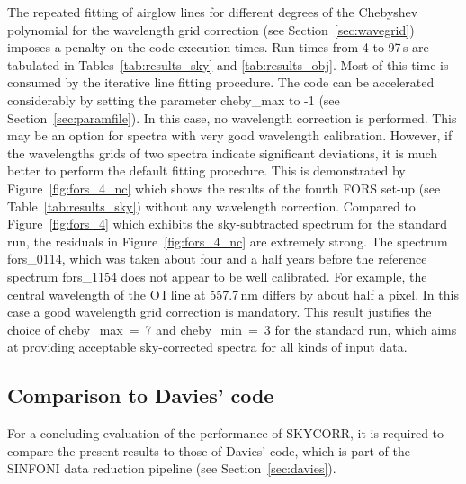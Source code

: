 The repeated fitting of airglow lines for different degrees of the Chebyshev
polynomial for the wavelength grid correction (see Section~\ref{sec:wavegrid})
imposes a penalty on the code execution times. Run times from 4 to 97\,s are
tabulated in Tables~\ref{tab:results_sky} and \ref{tab:results_obj}. Most of
this time is consumed by the iterative line fitting procedure. The code can be
accelerated considerably by setting the parameter {\sc cheby\_max} to -1 (see
Section~\ref{sec:paramfile}). In this case, no wavelength correction is
performed. This may be an option for spectra with very good wavelength
calibration. However, if the wavelengths grids of two spectra indicate
significant deviations, it is much better to perform the default fitting
procedure. This is demonstrated by Figure~\ref{fig:fors_4_nc} which shows the
results of the fourth FORS set-up (see Table~\ref{tab:results_sky}) without any
wavelength correction. Compared to Figure~\ref{fig:fors_4} which exhibits the
sky-subtracted spectrum for the standard run, the residuals in
Figure~\ref{fig:fors_4_nc} are extremely strong. The spectrum fors\_0114, which
was taken about four and a half years before the reference spectrum fors\_1154
does not appear to be well calibrated. For example, the central wavelength of
the O\,I line at 557.7\,nm differs by about half a pixel. In this case a good
wavelength grid correction is mandatory. This result justifies the choice
of {\sc cheby\_max}~=~7 and {\sc cheby\_min}~=~3 for the standard run, which
aims at providing acceptable sky-corrected spectra for all kinds of input data.

\subsection{Comparison to Davies' code}\label{sec:compdavies}
For a concluding evaluation of the performance of SKYCORR, it is required to
compare the present results to those of Davies' code, which is part of the
SINFONI data reduction pipeline (see Section~\ref{sec:davies}).

